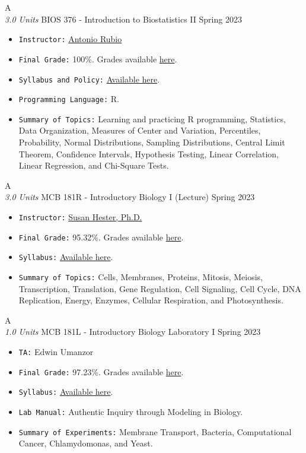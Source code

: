 \cventry
{A \\ \small{\textit{3.0 Units}}}
{BIOS 376 - Introduction to Biostatistics II}
{Spring 2023}
{}
{}
{
  \begin{itemize}
    \item \texttt{Instructor:} \href{https://publichealth.arizona.edu/directory/antonio-rubio}{Antonio Rubio}
    \item \texttt{Final Grade:} 100\%. Grades available \href{https://mhrezaei.com/assets/cv/courses/Spring2023/BIOS376/Grades.pdf}{here}.
    \item \texttt{Syllabus and Policy:} \href{https://mhrezaei.com/assets/cv/courses/Spring2023/BIOS376/Syllabus.pdf}{Available here}.
    \item \texttt{Programming Language:} R.
    \item \texttt{Summary of Topics:} Learning and practicing R programming, Statistics, Data Organization, Measures of Center and Variation, Percentiles, Probability, Normal Distributions, Sampling Distributions, Central Limit Theorem, Confidence Intervals, Hypothesis Testing, Linear Correlation, Linear Regression, and Chi-Square Tests.
  \end{itemize}
}

\cventry
{A \\ \small{\textit{3.0 Units}}}
{MCB 181R - Introductory Biology I (Lecture)}
{Spring 2023}
{}
{}
{
  \begin{itemize}
    \item \texttt{Instructor:} \href{https://mcb.arizona.edu/profile/susan-hester}{Susan Hester, Ph.D.}
    \item \texttt{Final Grade:} 95.32\%. Grades available \href{https://mhrezaei.com/assets/cv/courses/Spring2023/MCB181R/Grades.pdf}{here}.
    \item \texttt{Syllabus:} \href{https://mhrezaei.com/assets/cv/courses/Spring2023/MCB181R/Syllabus.pdf}{Available here}.
    \item \texttt{Summary of Topics:} Cells, Membranes, Proteins, Mitosis, Meiosis, Transcription, Translation, Gene Regulation, Cell Signaling, Cell Cycle, DNA Replication, Energy, Enzymes, Cellular Respiration, and Photosynthesis.
  \end{itemize}
}

\cventry
{A \\ \small{\textit{1.0 Units}}}
{MCB 181L - Introductory Biology Laboratory I}
{Spring 2023}
{}
{}
{
  \begin{itemize}
    \item \texttt{TA:} Edwin Umanzor
    \item \texttt{Final Grade:} 97.23\%. Grades available \href{https://mhrezaei.com/assets/cv/courses/Spring2023/MCB181L/Grades.pdf}{here}.
    \item \texttt{Syllabus:} \href{https://mhrezaei.com/assets/cv/courses/Spring2023/MCB181L/Syllabus.pdf}{Available here}.
    \item \texttt{Lab Manual:} Authentic Inquiry through Modeling in Biology.
    \item \texttt{Summary of Experiments:} Membrane Transport, Bacteria, Computational Cancer, Chlamydomonas, and Yeast.
  \end{itemize}
}

